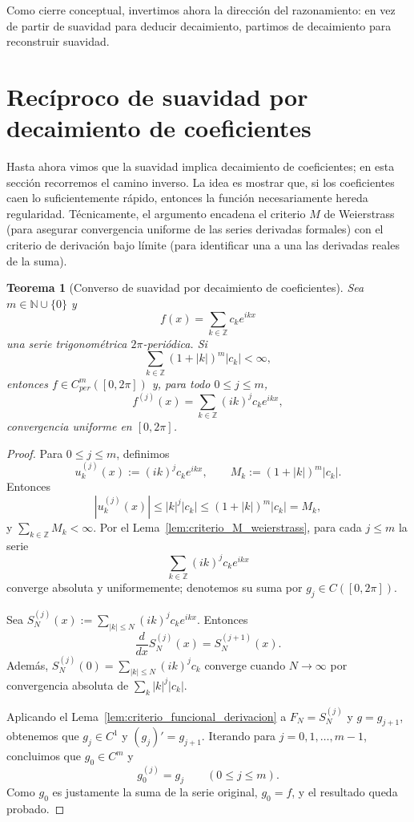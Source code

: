 \documentclass[a4paper,11pt]{report}
\newtheorem{theorem}{Teorema}[chapter]
\begin{document}
Como cierre conceptual, invertimos ahora la direcci\'on del razonamiento: en vez de partir de suavidad para deducir decaimiento, partimos de decaimiento para reconstruir suavidad.


\section{Recíproco de suavidad por decaimiento de coeficientes}

Hasta ahora vimos que la suavidad implica decaimiento de coeficientes; en esta secci\'on recorremos el camino inverso. La idea es mostrar que, si los coeficientes caen lo suficientemente r\'apido, entonces la funci\'on necesariamente hereda regularidad. T\'ecnicamente, el argumento encadena el criterio $M$ de Weierstrass (para asegurar convergencia uniforme de las series derivadas formales) con el criterio de derivaci\'on bajo l\'imite (para identificar una a una las derivadas reales de la suma).

\begin{theorem}[Converso de suavidad por decaimiento de coeficientes]\label{thm:converso_suavidad_decaimiento}
Sea $m\in\mathbb N\cup\{0\}$ y
\[
f(x)=\sum_{k\in\mathbb Z} c_k e^{ikx}
\]
una serie trigonométrica $2\pi$-periódica. Si
\[
\sum_{k\in\mathbb Z}(1+|k|)^m|c_k|<\infty,
\]
entonces $f\in C^m_{per}([0,2\pi])$ y, para todo $0\le j\le m$,
\[
f^{(j)}(x)=\sum_{k\in\mathbb Z}(ik)^j c_k e^{ikx},
\]
convergencia uniforme en $[0,2\pi]$.
\end{theorem}

\begin{proof}
Para $0\le j\le m$, definimos
\[
u_k^{(j)}(x):=(ik)^j c_k e^{ikx},
\qquad
M_k:=(1+|k|)^m|c_k|.
\]
Entonces
\[
|u_k^{(j)}(x)|\le |k|^j|c_k|\le (1+|k|)^m|c_k|=M_k,
\]
y $\sum_{k\in\mathbb Z}M_k<\infty$. Por el Lema~\ref{lem:criterio_M_weierstrass}, para cada $j\le m$ la serie
\[
\sum_{k\in\mathbb Z}(ik)^j c_k e^{ikx}
\]
converge absoluta y uniformemente; denotemos su suma por $g_j\in C([0,2\pi])$.

Sea $S_N^{(j)}(x):=\sum_{|k|\le N}(ik)^j c_k e^{ikx}$. Entonces
\[
\frac{d}{dx}S_N^{(j)}(x)=S_N^{(j+1)}(x).
\]
Además, $S_N^{(j)}(0)=\sum_{|k|\le N}(ik)^j c_k$ converge cuando $N\to\infty$ por convergencia absoluta de $\sum_k |k|^j|c_k|$.

Aplicando el Lema~\ref{lem:criterio_funcional_derivacion} a $F_N=S_N^{(j)}$ y $g=g_{j+1}$, obtenemos que $g_j\in C^1$ y $(g_j)'=g_{j+1}$. Iterando para $j=0,1,\dots,m-1$, concluimos que $g_0\in C^m$ y
\[
g_0^{(j)}=g_j\qquad(0\le j\le m).
\]
Como $g_0$ es justamente la suma de la serie original, $g_0=f$, y el resultado queda probado.
\end{proof}
\end{document}
